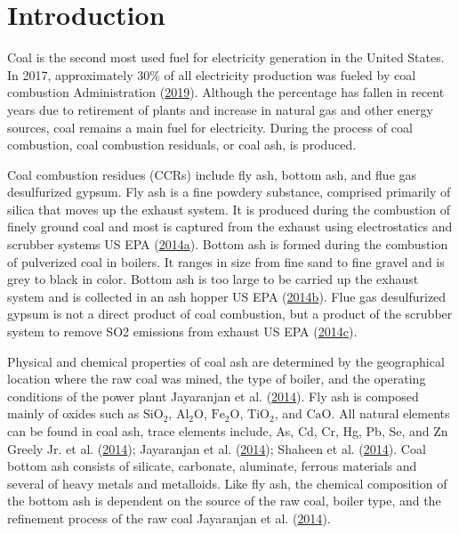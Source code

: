 \documentclass[ms]{uncgdissertationexp}
\theoremstyle{plain}
\theoremstyle{definition}
\theoremstyle{remark}
\begin{document}
  \chapter{Introduction}\label{intro}
  
  Coal is the second most used fuel for electricity generation in the
  United States. In 2017, approximately 30\% of all electricity production
  was fueled by coal combustion Administration
  (\protect\hyperlink{ref-usenergyinformationadministrationElectricPowerMonthly2019}{2019}).
  Although the percentage has fallen in recent years due to retirement of
  plants and increase in natural gas and other energy sources, coal
  remains a main fuel for electricity. During the process of coal
  combustion, coal combustion residuals, or coal ash, is produced.
  
  Coal combustion residues (CCRs) include fly ash, bottom ash, and flue
  gas desulfurized gypsum. Fly ash is a fine powdery substance, comprised
  primarily of silica that moves up the exhaust system. It is produced
  during the combustion of finely ground coal and most is captured from
  the exhaust using electrostatics and scrubber systems US EPA
  (\protect\hyperlink{ref-usepaFlyAshCoal2014}{2014}\protect\hyperlink{ref-usepaFlyAshCoal2014}{a}).
  Bottom ash is formed during the combustion of pulverized coal in
  boilers. It ranges in size from fine sand to fine gravel and is grey to
  black in color. Bottom ash is too large to be carried up the exhaust
  system and is collected in an ash hopper US EPA
  (\protect\hyperlink{ref-usepaBottomAshCoal2014}{2014}\protect\hyperlink{ref-usepaBottomAshCoal2014}{b}).
  Flue gas desulfurized gypsum is not a direct product of coal combustion,
  but a product of the scrubber system to remove SO2 emissions from
  exhaust US EPA
  (\protect\hyperlink{ref-usepaFlueGasDesulfurization2014}{2014}\protect\hyperlink{ref-usepaFlueGasDesulfurization2014}{c}).
  
  Physical and chemical properties of coal ash are determined by the
  geographical location where the raw coal was mined, the type of boiler,
  and the operating conditions of the power plant Jayaranjan et al.
  (\protect\hyperlink{ref-jayaranjanReuseOptionsCoal2014}{2014}). Fly ash
  is composed mainly of oxides such as \(\mathrm{SiO_2}\),
  \(\mathrm{Al_2O}\), \(\mathrm{Fe_2O}\), \(\mathrm{TiO_2}\), and
  \(\mathrm{CaO}\). All natural elements can be found in coal ash, trace
  elements include, As, Cd, Cr, Hg, Pb, Se, and Zn Greely Jr. et al.
  (\protect\hyperlink{ref-greelyjr.EffectsSedimentContaining2014}{2014});
  Jayaranjan et al.
  (\protect\hyperlink{ref-jayaranjanReuseOptionsCoal2014}{2014}); Shaheen
  et al.
  (\protect\hyperlink{ref-shaheenOpportunitiesChallengesUse2014}{2014}).
  Coal bottom ash consists of silicate, carbonate, aluminate, ferrous
  materials and several of heavy metals and metalloids. Like fly ash, the
  chemical composition of the bottom ash is dependent on the source of the
  raw coal, boiler type, and the refinement process of the raw coal
  Jayaranjan et al.
  (\protect\hyperlink{ref-jayaranjanReuseOptionsCoal2014}{2014}).
  
\end{document}
